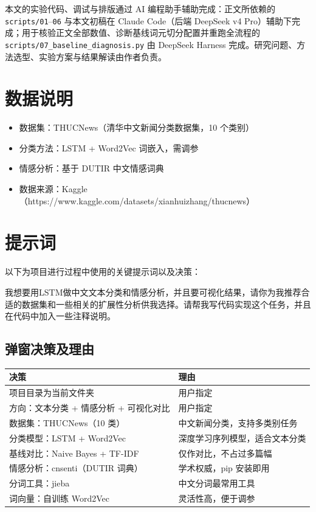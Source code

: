 \documentclass[12pt,a4paper]{article}
\begin{document}
本文的实验代码、调试与排版通过 AI 编程助手辅助完成：正文所依赖的 \texttt{scripts/01}--\texttt{06} 与本文初稿在 Claude Code（后端 DeepSeek v4 Pro）辅助下完成；用于核验正文全部数值、诊断基线词元切分配置并重跑全流程的 \texttt{scripts/07\_baseline\_diagnosis.py} 由 DeepSeek Harness 完成。研究问题、方法选型、实验方案与结果解读由作者负责。

\section{数据说明}


\begin{itemize}
    \item 数据集：THUCNews（清华中文新闻分类数据集，10 个类别）
    \item 分类方法：LSTM + Word2Vec 词嵌入，需调参
    \item 情感分析：基于 DUTIR 中文情感词典
    \item 数据来源：Kaggle（https://www.kaggle.com/datasets/xianhuizhang/thucnews）
\end{itemize}


\section{提示词}

以下为项目进行过程中使用的关键提示词以及决策：

我想要用LSTM做中文文本分类和情感分析，并且要可视化结果，请你为我推荐合适的数据集和一些相关的扩展性分析供我选择。请帮我写代码实现这个任务，并且在代码中加入一些注释说明。

\subsection*{弹窗决策及理由}

\begin{tabular}{ll}
\toprule
决策 & 理由 \\
\midrule
项目目录为当前文件夹 & 用户指定 \\
方向：文本分类 + 情感分析 + 可视化对比 & 用户指定 \\
数据集：THUCNews（10 类） & 中文新闻分类，支持多类别任务 \\
分类模型：LSTM + Word2Vec & 深度学习序列模型，适合文本分类 \\
基线对比：Naive Bayes + TF-IDF & 仅作对比，不占过多篇幅 \\
情感分析：cnsenti（DUTIR 词典） & 学术权威，pip 安装即用 \\
分词工具：jieba & 中文分词最常用工具 \\
词向量：自训练 Word2Vec & 灵活性高，便于调参 \\
\bottomrule
\end{tabular}
\end{document}
